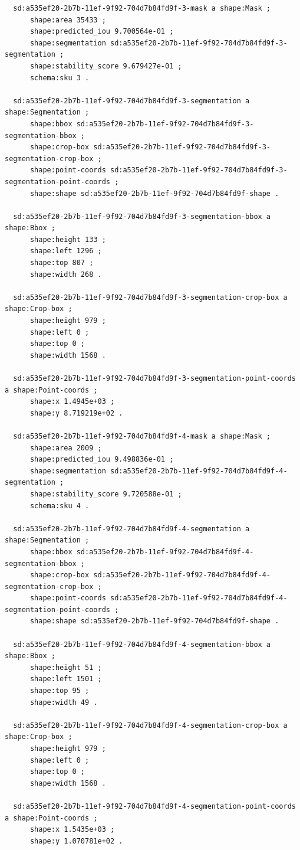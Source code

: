 \documentclass[732,fontsize=14pt,final]{studrep}
\begin{document}
\begin{verbatim}
  sd:a535ef20-2b7b-11ef-9f92-704d7b84fd9f-3-mask a shape:Mask ;
      shape:area 35433 ;
      shape:predicted_iou 9.700564e-01 ;
      shape:segmentation sd:a535ef20-2b7b-11ef-9f92-704d7b84fd9f-3-segmentation ;
      shape:stability_score 9.679427e-01 ;
      schema:sku 3 .
  
  sd:a535ef20-2b7b-11ef-9f92-704d7b84fd9f-3-segmentation a shape:Segmentation ;
      shape:bbox sd:a535ef20-2b7b-11ef-9f92-704d7b84fd9f-3-segmentation-bbox ;
      shape:crop-box sd:a535ef20-2b7b-11ef-9f92-704d7b84fd9f-3-segmentation-crop-box ;
      shape:point-coords sd:a535ef20-2b7b-11ef-9f92-704d7b84fd9f-3-segmentation-point-coords ;
      shape:shape sd:a535ef20-2b7b-11ef-9f92-704d7b84fd9f-shape .
  
  sd:a535ef20-2b7b-11ef-9f92-704d7b84fd9f-3-segmentation-bbox a shape:Bbox ;
      shape:height 133 ;
      shape:left 1296 ;
      shape:top 807 ;
      shape:width 268 .
  
  sd:a535ef20-2b7b-11ef-9f92-704d7b84fd9f-3-segmentation-crop-box a shape:Crop-box ;
      shape:height 979 ;
      shape:left 0 ;
      shape:top 0 ;
      shape:width 1568 .
  
  sd:a535ef20-2b7b-11ef-9f92-704d7b84fd9f-3-segmentation-point-coords a shape:Point-coords ;
      shape:x 1.4945e+03 ;
      shape:y 8.719219e+02 .
  
  sd:a535ef20-2b7b-11ef-9f92-704d7b84fd9f-4-mask a shape:Mask ;
      shape:area 2009 ;
      shape:predicted_iou 9.498836e-01 ;
      shape:segmentation sd:a535ef20-2b7b-11ef-9f92-704d7b84fd9f-4-segmentation ;
      shape:stability_score 9.720588e-01 ;
      schema:sku 4 .
  
  sd:a535ef20-2b7b-11ef-9f92-704d7b84fd9f-4-segmentation a shape:Segmentation ;
      shape:bbox sd:a535ef20-2b7b-11ef-9f92-704d7b84fd9f-4-segmentation-bbox ;
      shape:crop-box sd:a535ef20-2b7b-11ef-9f92-704d7b84fd9f-4-segmentation-crop-box ;
      shape:point-coords sd:a535ef20-2b7b-11ef-9f92-704d7b84fd9f-4-segmentation-point-coords ;
      shape:shape sd:a535ef20-2b7b-11ef-9f92-704d7b84fd9f-shape .
  
  sd:a535ef20-2b7b-11ef-9f92-704d7b84fd9f-4-segmentation-bbox a shape:Bbox ;
      shape:height 51 ;
      shape:left 1501 ;
      shape:top 95 ;
      shape:width 49 .
  
  sd:a535ef20-2b7b-11ef-9f92-704d7b84fd9f-4-segmentation-crop-box a shape:Crop-box ;
      shape:height 979 ;
      shape:left 0 ;
      shape:top 0 ;
      shape:width 1568 .
  
  sd:a535ef20-2b7b-11ef-9f92-704d7b84fd9f-4-segmentation-point-coords a shape:Point-coords ;
      shape:x 1.5435e+03 ;
      shape:y 1.070781e+02 .
  

\end{verbatim}
\end{document}
